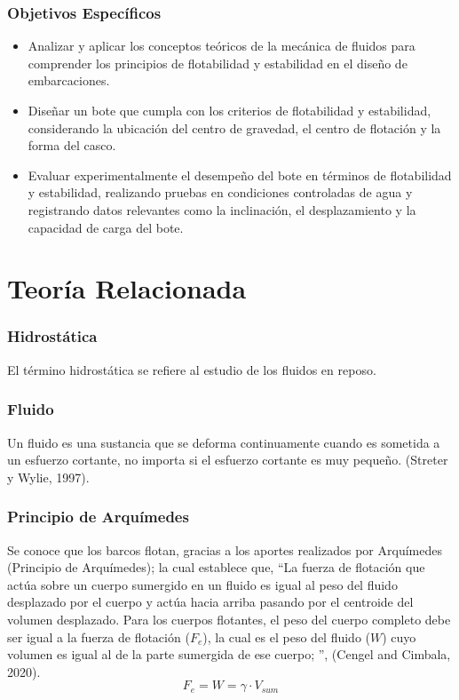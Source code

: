 \documentclass[letterpaper]{article}
\begin{document}
\subsubsection{Objetivos Específicos}
\begin{itemize}
	\item Analizar y aplicar los conceptos teóricos de la mecánica de fluidos para comprender los principios de flotabilidad y estabilidad en el diseño de embarcaciones.
	\item Diseñar un bote que cumpla con los criterios de flotabilidad y estabilidad, considerando la ubicación del centro de gravedad, el centro de flotación y la forma del casco.
	\item Evaluar experimentalmente el desempeño del bote en términos de flotabilidad y estabilidad, realizando pruebas en condiciones controladas de agua y registrando datos relevantes como la inclinación, el desplazamiento y la capacidad de carga del bote.
\end{itemize}
\newpage

\section{Teoría Relacionada}
\subsubsection{Hidrostática}
\setlength{\parindent}{18pt}

El término hidrostática se refiere al estudio de los fluidos en reposo.

\subsubsection{Fluido}
\setlength{\parindent}{18pt}
Un fluido es una sustancia que se deforma continuamente cuando es sometida 
a un esfuerzo cortante, no importa si el esfuerzo cortante es muy pequeño. (Streter y Wylie, 1997). 

\subsubsection{Principio de Arquímedes}
\setlength{\parindent}{18pt}
Se conoce que los barcos flotan, gracias a los aportes realizados por Arquímedes (Principio de Arquímedes);
la cual establece que, ``La fuerza de flotación que actúa sobre un cuerpo sumergido en un fluido es igual
al peso del fluido desplazado por el cuerpo y actúa hacia arriba pasando por el
centroide del volumen desplazado. Para los cuerpos flotantes, el peso del cuerpo completo debe ser igual a la fuerza
de flotación ($F_{e}$), la cual es el peso del fluido ($W$) cuyo volumen es igual al de la parte sumergida
de ese cuerpo; '', (Cengel and Cimbala, 2020). 
\begin{equation}
	F_{e}= W = \gamma \cdot  V_{sum} 
\end{equation}
\end{document}

